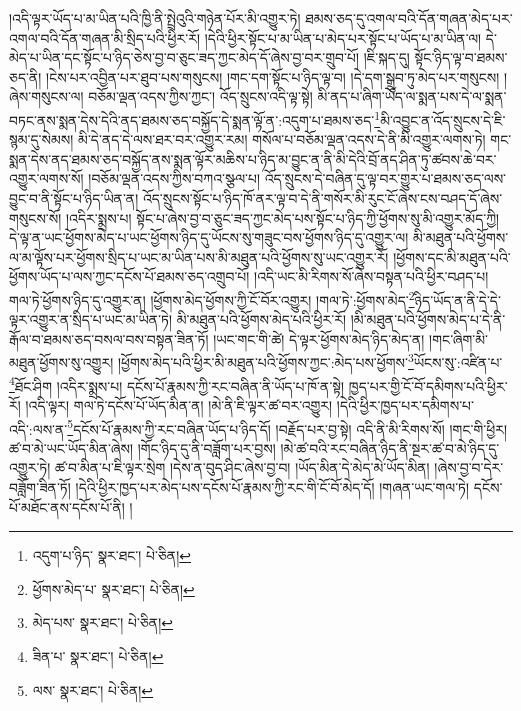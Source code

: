 །འདི་ལྟར་ཡོད་པ་མ་ཡིན་པའི་ཁྱི་ནི་སྤྲེའུའི་གཉེན་པོར་མི་འགྱུར་ཏེ། ཐམས་ཅད་དུ་འགལ་བའི་དོན་གཞན་མེད་པར་འགལ་བའི་དོན་གཞན་མི་སྲིད་པའི་ཕྱིར་རོ། །དེའི་ཕྱིར་སྟོང་པ་མ་ཡིན་པ་མེད་པར་སྟོང་པ་ཡོད་པ་མ་ཡིན་ལ། དེ་མེད་པ་ཡིན་དང་སྟོང་པ་ཉིད་ཅེས་བྱ་བ་ཅུང་ཟད་ཀྱང་མེད་དོ་ཞེས་བྱ་བར་གྲུབ་པོ། །ཇི་སྐད་དུ། སྟོང་ཉིད་ལྟ་བ་ཐམས་ཅད་ནི། །ངེས་པར་འབྱིན་པར་ཐུབ་པས་གསུངས། །གང་དག་སྟོང་པ་ཉིད་ལྟ་བ། །དེ་དག་སྒྲུབ་ཏུ་མེད་པར་གསུངས། །ཞེས་གསུངས་ལ། བཅོམ་ལྡན་འདས་ཀྱིས་ཀྱང་། འོད་སྲུངས་འདི་ལྟ་སྟེ། མི་ནད་པ་ཞིག་ཡོད་ལ་སྨན་པས་དེ་ལ་སྨན་བཏང་ནས་སྨན་དེས་དེའི་ནད་ཐམས་ཅད་བསྐྱོད་དེ་སྨན་ལྟོ་ན་:འདུག་པ་ཐམས་ཅད་\footnote{འདུག་པ་ཉིད་  སྣར་ཐང་།  པེ་ཅིན། }མི་འབྱུང་ན་འོད་སྲུངས་དེ་ཇི་སྙམ་དུ་སེམས། མི་དེ་ནད་དེ་ལས་ཐར་བར་འགྱུར་རམ། གསོལ་པ་བཅོམ་ལྡན་འདས་དེ་ནི་མི་འགྱུར་ལགས་ཏེ། གང་སྨན་དེས་ནད་ཐམས་ཅད་བསྐྱོད་ནས་སྨན་ལྟོར་མཆིས་པ་ཉིད་མ་བྱུང་ན་ནི་མི་དེའི་བྲོ་ནད་ཤིན་ཏུ་ཚབས་ཆེ་བར་འགྱུར་ལགས་སོ། །བཅོམ་ལྡན་འདས་ཀྱིས་བཀའ་སྩལ་པ། འོད་སྲུངས་དེ་བཞིན་དུ་ལྟ་བར་གྱུར་པ་ཐམས་ཅད་ལས་བྱུང་བ་ནི་སྟོང་པ་ཉིད་ཡིན་ན། འོད་སྲུངས་སྟོང་པ་ཉིད་ཁོ་ནར་ལྟ་བ་དེ་ནི་གསོར་མི་རུང་ངོ་ཞེས་ངས་བཤད་དོ་ཞེས་གསུངས་སོ། །འདིར་སྨྲས་པ། སྟོང་པ་ཞེས་བྱ་བ་ཅུང་ཟད་ཀྱང་མེད་པས་སྟོང་པ་ཉིད་ཀྱི་ཕྱོགས་སུ་མི་འགྱུར་མོད་ཀྱི། དེ་ལྟ་ན་ཡང་ཕྱོགས་མེད་པ་ཡང་ཕྱོགས་ཉིད་དུ་ཡོངས་སུ་གཟུང་བས་ཕྱོགས་ཉིད་དུ་འགྱུར་ལ། མི་མཐུན་པའི་ཕྱོགས་ལ་མ་ལྟོས་པར་ཕྱོགས་སྲིད་པ་ཡང་མ་ཡིན་པས་མི་མཐུན་པའི་ཕྱོགས་སུ་ཡང་འགྱུར་རོ། །ཕྱོགས་དང་མི་མཐུན་པའི་ཕྱོགས་ཡོད་པ་ལས་ཀྱང་དངོས་པོ་ཐམས་ཅད་འགྲུབ་པོ། །འདི་ཡང་མི་རིགས་སོ་ཞེས་བསྟན་པའི་ཕྱིར་བཤད་པ། གལ་ཏེ་ཕྱོགས་ཉིད་དུ་འགྱུར་ན། །ཕྱོགས་མེད་ཕྱོགས་ཀྱི་ངོ་བོར་འགྱུར། །གལ་ཏེ་:ཕྱོགས་མེད་\footnote{ཕྱོགས་མེད་པ་  སྣར་ཐང་།  པེ་ཅིན། }ཉིད་ཡོད་ན་ནི་དེ་དེ་ལྟར་འགྱུར་ན་སྲིད་པ་ཡང་མ་ཡིན་ཏེ། མི་མཐུན་པའི་ཕྱོགས་མེད་པའི་ཕྱིར་རོ། །མི་མཐུན་པའི་ཕྱོགས་མེད་པ་དེ་ནི་རྒོལ་བ་ཐམས་ཅད་བསལ་བས་བསྟན་ཟིན་ཏོ། །ཡང་གང་གི་ཚེ། དེ་ལྟར་ཕྱོགས་མེད་ཉིད་མེད་ན། །གང་ཞིག་མི་མཐུན་ཕྱོགས་སུ་འགྱུར། །ཕྱོགས་མེད་པའི་ཕྱིར་མི་མཐུན་པའི་ཕྱོགས་ཀྱང་:མེད་པས་ཕྱོགས་\footnote{མེད་པས་  སྣར་ཐང་།  པེ་ཅིན། }ཡོངས་སུ་:འཛིན་པ་\footnote{ཟིན་པ་  སྣར་ཐང་།  པེ་ཅིན། }ཐོང་ཤིག །འདིར་སྨྲས་པ། དངོས་པོ་རྣམས་ཀྱི་རང་བཞིན་ནི་ཡོད་པ་ཁོ་ན་སྟེ། ཁྱད་པར་གྱི་ངོ་བོ་དམིགས་པའི་ཕྱིར་རོ། །འདི་ལྟར། གལ་ཏེ་དངོས་པོ་ཡོད་མིན་ན། །མེ་ནི་ཇི་ལྟར་ཚ་བར་འགྱུར། །དེའི་ཕྱིར་ཁྱད་པར་དམིགས་པ་འདི་:ལས་ན་\footnote{ལས་  སྣར་ཐང་།  པེ་ཅིན། }དངོས་པོ་རྣམས་ཀྱི་རང་བཞིན་ཡོད་པ་ཉིད་དོ། །བརྗོད་པར་བྱ་སྟེ། འདི་ནི་མི་རིགས་སོ། །གང་གི་ཕྱིར། ཚ་བ་མེ་ཡང་ཡོད་མིན་ཞེས། །གོང་ཉིད་དུ་ནི་བཟློག་པར་བྱས། །མེ་ཚ་བའི་རང་བཞིན་ཉིད་ནི་སྔར་ཚ་བ་མེ་ཉིད་དུ་འགྱུར་ཏེ། ཚ་བ་མིན་པ་ཇི་ལྟར་སྲེག །དེས་ན་བུད་ཤིང་ཞེས་བྱ་བ། །ཡོད་མིན་དེ་མེད་མེ་ཡོད་མིན། །ཞེས་བྱ་བ་དེར་བཟློག་ཟིན་ཏོ། །དེའི་ཕྱིར་ཁྱད་པར་མེད་པས་དངོས་པོ་རྣམས་ཀྱི་རང་གི་ངོ་བོ་མེད་དོ། །གཞན་ཡང་གལ་ཏེ། དངོས་པོ་མཐོང་ནས་དངོས་པོ་ནི། །
